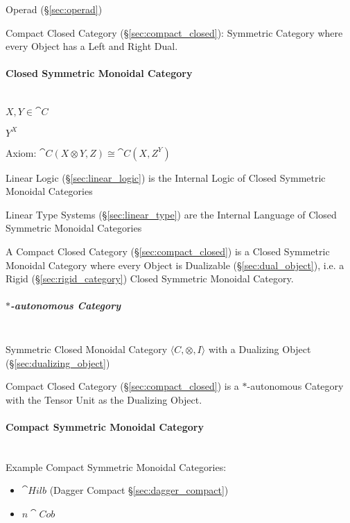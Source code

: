 Operad (\S\ref{sec:operad})

Compact Closed Category (\S\ref{sec:compact_closed}): Symmetric
Category where every Object has a Left and Right Dual.



\paragraph{Closed Symmetric Monoidal Category}
\label{sec:closed_symmetric_monoidal}
\hfill \\

$X, Y \in \cat{C}$

$Y^X$

Axiom: $\cat{C}(X \otimes Y, Z) \cong \cat{C}(X, Z^Y)$

Linear Logic (\S\ref{sec:linear_logic}) is the Internal Logic of
Closed Symmetric Monoidal Categories

Linear Type Systems (\S\ref{sec:linear_type}) are the Internal
Language of Closed Symmetric Monoidal Categories

A Compact Closed Category (\S\ref{sec:compact_closed}) is a Closed
Symmetric Monoidal Category where every Object is Dualizable
(\S\ref{sec:dual_object}), i.e. a Rigid (\S\ref{sec:rigid_category})
Closed Symmetric Monoidal Category.



\subparagraph{$*$-autonomous Category}\label{sec:star_autonomous}
\hfill \\

Symmetric Closed Monoidal Category $\langle C, \otimes, I \rangle$
with a Dualizing Object (\S\ref{sec:dualizing_object})

Compact Closed Category (\S\ref{sec:compact_closed}) is a
$*$-autonomous Category with the Tensor Unit as the Dualizing Object.



\paragraph{Compact Symmetric Monoidal Category}
\label{sec:compact_symmetric_monoidal}
\hfill \\

Example Compact Symmetric Monoidal Categories:

\begin{itemize}
\item $\cat{Hilb}$ (Dagger Compact \S\ref{sec:dagger_compact})
\item $n\cat{Cob}$
\end{itemize}



